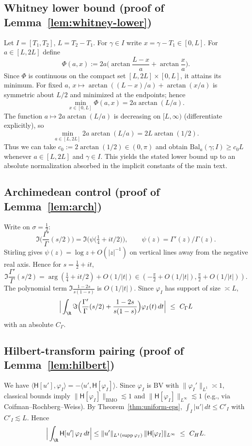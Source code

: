 \documentclass[11pt]{article}
\theoremstyle{remark}
\begin{document}
\subsection{Whitney lower bound (proof of Lemma~\ref{lem:whitney-lower})}
Let \(I=[T_1,T_2]\), \(L=T_2-T_1\). For \(\gamma\in I\) write \(x=\gamma-T_1\in[0,L]\). For \(a\in[L,2L]\) define
\[\Phi(a,x):=2a\Big(\arctan\frac{L-x}{a}+\arctan\frac{x}{a}\Big).\]
Since \(\Phi\) is continuous on the compact set \([L,2L]\times[0,L]\), it attains its minimum. For fixed \(a\), \(x\mapsto\arctan((L-x)/a)+\arctan(x/a)\) is symmetric about \(L/2\) and minimized at the endpoints; hence
\[\min_{x\in[0,L]}\Phi(a,x)=2a\arctan(L/a).\]
The function \(a\mapsto 2a\arctan(L/a)\) is decreasing on \([L,\infty)\) (differentiate explicitly), so
\[\min_{a\in[L,2L]}2a\arctan(L/a)=2L\arctan(1/2).\]
Thus we can take \(c_0:=2\arctan(1/2)\in(0,\pi)\) and obtain \(\mathrm{Bal}_a(\gamma;I)\ge c_0 L\) whenever \(a\in[L,2L]\) and \(\gamma\in I\). This yields the stated lower bound up to an absolute normalization absorbed in the implicit constants of the main text.

\subsection{Archimedean control (proof of Lemma~\ref{lem:arch})}
Write on \(\sigma=\tfrac12\):
\[\Im\Big(\frac{\Gamma'}{\Gamma}(s/2)\Big)=\Im\Big(\psi\big(\tfrac14+it/2\big)\Big),\qquad \psi(z)=\Gamma'(z)/\Gamma(z).\]
Stirling gives \(\psi(z)=\log z+O(|z|^{-1})\) on vertical lines away from the negative real axis. Hence for \(s=\tfrac12+it\),
\[\Im\frac{\Gamma'}{\Gamma}(s/2)=\arg(\tfrac14+it/2)+O(1/|t|)\in(-\tfrac{\pi}{2}+O(1/|t|),\tfrac{\pi}{2}+O(1/|t|)).\]
The polynomial term \(\Im\frac{1-2s}{s(1-s)}\) is \(O(1/|t|)\). Since \(\varphi_I\) has support of size \(\asymp L\),
\[\Big|\int_{\R}\Im\Big(\frac{\Gamma'}{\Gamma}(s/2)+\frac{1-2s}{s(1-s)}\Big)\varphi_I(t)\,dt\Big|\ \le\ C_\Gamma L\]
with an absolute \(C_\Gamma\).

\subsection{Hilbert-transform pairing (proof of Lemma~\ref{lem:hilbert})}
We have \(\langle \mathsf H[u'],\varphi_I\rangle=-\langle u',\mathsf H[\varphi_I]\rangle\). Since \(\varphi_I\) is BV with \(\|\varphi_I'\|_{L^1}\asymp 1\), classical bounds imply \(\|\mathsf H[\varphi_I]\|_{\mathrm{BMO}}\lesssim 1\) and \(\|\mathsf H[\varphi_I]\|_{L^\infty}\lesssim 1\) (e.g., via Coifman–Rochberg–Weiss). By Theorem~\ref{thm:uniform-eps}, \(\int_I |u'|\,dt\le C'_I\) with \(C'_I\lesssim L\). Hence
\[\Big|\int_{\R}\mathsf H[u']\,\varphi_I\,dt\Big|\le \|u'\|_{L^1(\mathrm{supp}\,\varphi_I)}\,\|\mathsf H[\varphi_I]\|_{L^\infty}\ \le\ C_H L.\]
\end{document}
